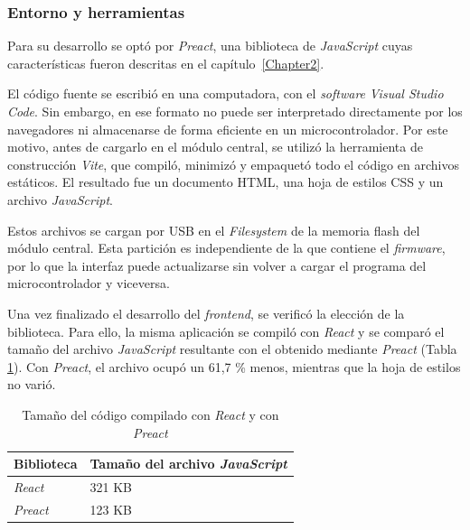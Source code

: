 \subsubsection{Entorno y herramientas}

Para su desarrollo se optó por \emph{Preact}, una biblioteca de \emph{JavaScript} cuyas características fueron descritas en el capítulo~\ref{Chapter2}.

El código fuente se escribió en una computadora, con el \emph{software} \emph{Visual Studio Code}. Sin embargo, en ese formato no puede ser interpretado directamente por los navegadores ni almacenarse de forma eficiente en un microcontrolador. Por este motivo, antes de cargarlo en el módulo central, se utilizó la herramienta de construcción \emph{Vite}, que compiló, minimizó y empaquetó todo el código en archivos estáticos. El resultado fue un documento HTML, una hoja de estilos CSS y un archivo \emph{JavaScript}.

Estos archivos se cargan por USB en el \emph{Filesystem} de la memoria flash del módulo central. Esta partición es independiente de la que contiene el \emph{firmware}, por lo que la interfaz puede actualizarse sin volver a cargar el programa del microcontrolador y viceversa.

Una vez finalizado el desarrollo del \emph{frontend}, se verificó la elección de la biblioteca. Para ello, la misma aplicación se compiló con \emph{React} y se comparó el tamaño del archivo \emph{JavaScript} resultante con el obtenido mediante \emph{Preact} (Tabla \ref{tab:preactreact}). Con \emph{Preact}, el archivo ocupó un 61,7 \% menos, mientras que la hoja de estilos no varió.

\begin{table}[H]
    \centering
    \caption{Tamaño del código compilado con \emph{React} y con \emph{Preact}}
    \label{tab:preactreact}
    \begin{tabular}{|l|l|}
        \hline
        \textbf{Biblioteca} & \textbf{Tamaño del archivo \emph{JavaScript}} \\
        \hline
        \emph{React} & 321 KB \\
        \hline
        \emph{Preact} & 123 KB \\
        \hline
    \end{tabular}
\end{table}

